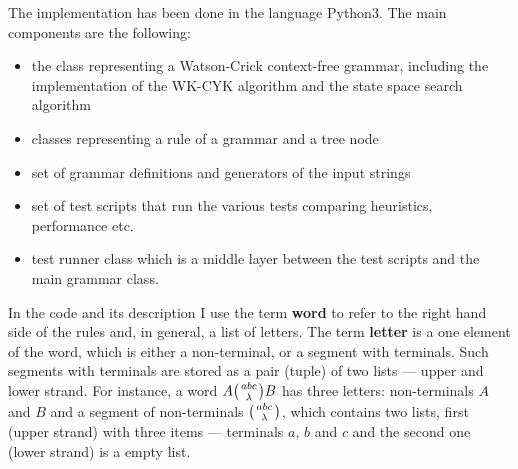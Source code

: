 The implementation has been done in the language Python3. The main components are the following:
\begin{itemize}
  \item{the class representing a Watson-Crick context-free grammar, including the implementation of the WK-CYK algorithm and the state space search algorithm}
  \item{classes representing a rule of a grammar and a tree node}
  \item{set of grammar definitions and generators of the input strings}
  \item{set of test scripts that run the various tests comparing heuristics, performance etc.}
  \item{test runner class which is a middle layer between the test scripts and the main grammar class.}
\end{itemize}

In the code and its description I use the term \textbf{word} to refer to the right hand side of the rules and, in general, a list of letters. The term \textbf{letter} is a one element of the word, which is either a non-terminal, or a segment with terminals. Such segments with terminals are stored as a pair (tuple) of two lists --- upper and lower strand. For instance, a word
$A \wkpair{abc}{\lambda} B$
has three letters: non-terminals $A$ and $B$ and a segment of non-terminals $\wkpair{abc}{\lambda}$, which contains two lists, first (upper strand) with three items --- terminals $a$, $b$ and $c$ and the second one (lower strand) is a empty list.


